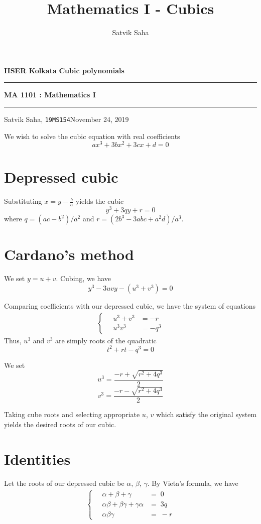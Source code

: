 \documentclass[10pt]{article}
\title{Mathematics I - Cubics}
\author{Satvik Saha}
\date{}
\begin{document}
        \par\textbf{IISER Kolkata} \hfill \textbf{Cubic polynomials}
        \vspace{3pt}
        \hrule
        \vspace{3pt}
        \begin{center}
                \LARGE{\textbf{MA 1101 : Mathematics I}}
        \end{center}
        \vspace{3pt}
        \hrule
        \vspace{3pt}
        Satvik Saha, \texttt{19MS154}\hfill November 24, 2019
        \vspace{20pt}
        
        We wish to solve the cubic equation with real coefficients
        \[ax^3 + 3bx^2 + 3cx + d = 0\]
        \section{Depressed cubic}
        Substituting $x = y - \frac{b}{a}$ yields the cubic
        \[y^3 + 3qy + r = 0\]
        where $q = (ac - b^2)/a^2$ and $r = (2b^3 - 3abc + a^2d)/a^3$.
        \section{Cardano's method}
        We set $y = u + v$. Cubing, we have
        \[y^3 - 3uvy - (u^3 + v^3) = 0\]
        
        Comparing coefficients with our depressed cubic, we have the system of equations
        \begin{align*}
        \begin{cases}
                \quad u^3 + v^3 &= -r \\
                \quad u^3 v^3 &= -q^3
        \end{cases}
        \end{align*}
        Thus, $u^3$ and $v^3$ are simply roots of the quadratic
        \[t^2 + rt - q^3 = 0\]

        We set 
        \[ u^3 = \frac{-r + \sqrt{r^2 + 4q^3}}2 \]
        \[ v^3 = \frac{-r - \sqrt{r^2 + 4q^3}}2 \]
        
        Taking cube roots and selecting appropriate $u$, $v$ which satisfy the original system yields the desired roots of our cubic.

        \section{Identities}
        Let the roots of our depressed cubic be $\alpha$, $\beta$, $\gamma$. By Vieta's formula, we have
        \begin{align*}
        \begin{cases}
                \quad\alpha + \beta + \gamma &=\; 0 \\
                \quad\alpha\beta + \beta\gamma + \gamma\alpha &=\; 3q \\
                \quad\alpha\beta\gamma &=\; -r
        \end{cases}
        \end{align*}
\end{document}
